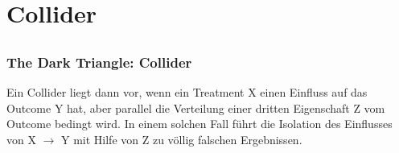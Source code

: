 \documentclass[18pt, aspectratio=169]{beamer}
\begin{document}

\section{Collider}
\subsection*{}

\begin{frame}
\frametitle{The Dark Triangle: Collider}
\begin{figure}
\centering
{}
\end{figure}

{{Ein Collider liegt dann vor, wenn ein Treatment X einen Einfluss auf das Outcome Y hat, aber parallel die Verteilung einer dritten Eigenschaft Z vom Outcome bedingt wird.  In einem solchen Fall führt die Isolation des Einflusses von X $\rightarrow$ Y mit Hilfe von Z zu völlig falschen Ergebnissen.}}

\end{frame}
\end{document}
